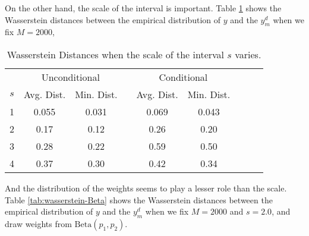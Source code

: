 \documentclass[12pt]{article}
\begin{document}
On the other hand, the scale of the interval is important. Table \ref{tab:wasserstein-scale} shows the Wasserstein distances between the empirical distribution of \(y\) and the \(y^{d}_{m}\) when we fix \(M = 2000\),
\begin{table}[htbp]
    \centering
    \begin{tabular}{ccccccccc}
        \hline
              & \multicolumn{2}{c}{Unconditional} &            & \multicolumn{2}{c}{Conditional}                           \\
        \cline{2-3} \cline{5-6}
        \(s\) & Avg. Dist.                        & Min. Dist. &                                 & Avg. Dist. & Min. Dist. \\
        \hline
        1     & 0.055                             & 0.031      &                                 & 0.069      & 0.043      \\
        2     & 0.17                              & 0.12       &                                 & 0.26       & 0.20       \\
        3     & 0.28                              & 0.22       &                                 & 0.59       & 0.50       \\
        4     & 0.37                              & 0.30       &                                 & 0.42       & 0.34       \\
        \hline
    \end{tabular}
    \caption{Wasserstein Distances when the scale of the interval \(s\) varies.}
    \label{tab:wasserstein-scale}
\end{table}

And the distribution of the weights seems to play a lesser role than the scale. Table \ref{tab:wasserstein-Beta} shows the Wasserstein distances between the empirical distribution of \(y\) and the \(y^{d}_{m}\) when we fix \(M = 2000\) and \(s = 2.0\), and draw weights from \(\text{Beta}(p_{1},p_{2})\).
\end{document}
